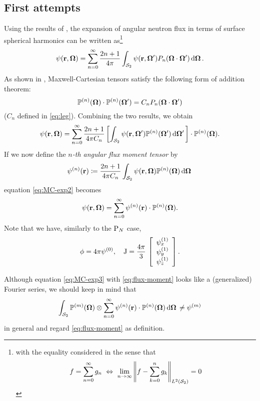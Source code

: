 \subsection{First attempts}
Using the results of , the expansion of angular neutron flux in terms of surface spherical 
harmonics can be written as\footnote{with the equality considered in the sense that $$f = \sum_{n=0}^{\infty}g_{n}\
\Leftrightarrow\ \lim_{n\to\infty} \left\Vert f - \sum_{k=0}^{n} g_{k} \right\Vert_{\Lp[2](\Sphere)} = 0$$}
\begin{equation}\label{eq:MC-exp1}
  \psi(\br,\bomega) = \suma[n]{0}{\infty}\frac{2n+1}{4\pi}\intA{\psi(\br,\bomega')P_n(\bomega\cdot\bomega')}.
\end{equation}
As shown in \cite[Sec. 7, Corollary II]{Applequist1}, Maxwell-Cartesian tensors
satisfy the following form of addition theorem:
\begin{equation}\label{eq:MC-addition}
  \PP(\bomega)\contr\PP(\bomega') = C_n P_n(\bomega\cdot\bomega')
\end{equation}
($C_n$ defined in \eqref{eq:leg}). Combining the two results, we obtain
\begin{equation}\label{eq:MC-exp2}
  \psi(\br,\bomega) = \suma[n]{0}{\infty}\frac{2n+1}{4\pi
  C_n}\left[\intA[']{\psi(\br,\bomega')\PP(\bomega')}\right]\contr\PP(\bomega).
\end{equation}
If we now define the \textit{$n$-th angular flux moment tensor} by
\begin{equation}\label{eq:flux-moment}
  \fmom(\br) \coloneqq \frac{2n+1}{4\pi C_n}\intA{\psi(\br,\bomega)\PP(\bomega)}
\end{equation}
equation \eqref{eq:MC-exp2} becomes
\begin{equation}\label{eq:MC-exp3}
  \psi(\br,\bomega) = \suma[n]{0}{\infty}\fmom(\br)\contr\PP(\bomega).
\end{equation}
Note that we have, similarly to the $\PN$ case, 
$$
	\phi = 4\pi\fmom[0],\quad \bJ = \frac{4\pi }{3}\, \left[\begin{array}{c}\fmom[1]_x\\
	\fmom[1]_y\\ \fmom[1]_z\end{array}\right].
$$

Although equation \eqref{eq:MC-exp3} with \eqref{eq:flux-moment} looks like a (generalized) Fourier series, we should 
keep in mind that
$$
  \intA{\PP[m](\bomega)\otimes\suma[n]{0}{\infty}\fmom(\br)\contr\PP(\bomega)} \neq \fmom[m]
$$
in general and regard \eqref{eq:flux-moment} as definition.


